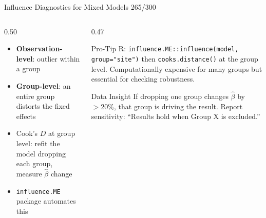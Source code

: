 \documentclass[10pt]{beamer}
\newcommand{\smark}[1]{\hfill{\scriptsize\color{codegray}#1}}
\begin{document}
\begin{frame}{Influence Diagnostics for Mixed Models}
\smark{265/300}
\begin{columns}[T]
\begin{column}{0.50\textwidth}
\begin{itemize}
    \item \textbf{Observation-level}: outlier within a group
    \item \textbf{Group-level}: an entire group distorts the fixed effects
    \item Cook's $D$ at group level: refit the model dropping each group, measure $\hat{\beta}$ change
    \item \texttt{influence.ME} package automates this
\end{itemize}
\end{column}
\begin{column}{0.47\textwidth}
\begin{alertblock}{Pro-Tip}
    \scriptsize R: \texttt{influence.ME::influence(model, group="site")} then \texttt{cooks.distance()} at the group level. Computationally expensive for many groups but essential for checking robustness.
\end{alertblock}
\vspace{0.1cm}
\begin{exampleblock}{Data Insight}
    \scriptsize If dropping one group changes $\hat{\beta}$ by $> 20\%$, that group is driving the result. Report sensitivity: ``Results hold when Group X is excluded.''
\end{exampleblock}
\end{column}
\end{columns}
\end{frame}
\end{document}
